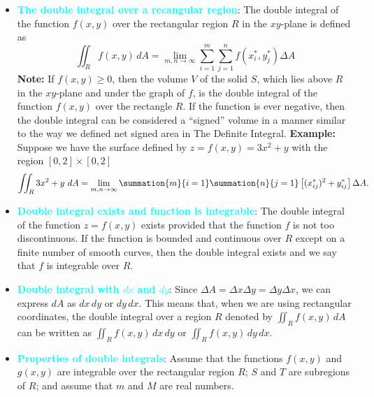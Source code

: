 \documentclass{report}
\begin{document}
\begin{itemize}
        \item \textbf{\textcolor{cyan}{The double integral over a recangular region}}:
            The double integral of the function $f(x,y)$ over the rectangular region $R$ in the $xy$-plane is defined as
            \begin{equation}
                \iint_{R} f(x,y) \, dA = \lim_{m,n \to \infty} \sum_{i=1}^{m}\sum_{j=1}^{n} f(x^*_{i}, y^*_{j})\Delta A 
            \end{equation}
            \bigbreak \noindent 
            \textbf{Note:} If $f(x,y) \geq 0$, then the volume $V$ of the solid $S$, which lies above $R$ in the $xy$-plane and under the graph of $f$, is the double integral of the function $f(x,y)$ over the rectangle $R$. If the function is ever negative, then the double integral can be considered a “signed” volume in a manner similar to the way we defined net signed area in The Definite Integral.
            \bigbreak \noindent 
            \textbf{Example:} Suppose we have the surface defined by $z=f(x,y) = 3x^{2} + y$ with the region $[0,2] \times [0,2]$
            \begin{align*}
                \iint_{R} 3x^{2} + y\ dA = \lim\limits_{m,n \to \infty}{\summation{m}{i=1}\summation{n}{j=1} \left[(x^{*}_{ij})^{2} + y^{*}_{ij}\right]\Delta A}
            .\end{align*}
        \item \textbf{\textcolor{cyan}{Double integral exists and function is integrable}}:
            The double integral of the function $z = f(x,y)$ exists provided that the function $f$ is not too discontinuous. If the function is bounded and continuous over $R$ except on a finite number of smooth curves, then the double integral exists and we say that $f$ is integrable over $R$.
        \item \textbf{\textcolor{cyan}{Double integral with $dx$ and $dy$}}: 
            Since $\Delta A = \Delta x \Delta y = \Delta y \Delta x$, we can express $dA$ as $dx\,dy$ or $dy\,dx$. This means that, when we are using rectangular coordinates, the double integral over a region $R$ denoted by $\iint_{R} f(x,y) \, dA$ can be written as $\iint_{R} f(x,y) \, dx\,dy$ or $\iint_{R} f(x,y) \, dy\,dx$.
        \item \textbf{\textcolor{cyan}{Properties of double integrals}}:
            Assume that the functions $f(x,y)$ and $g(x,y)$ are integrable over the rectangular region $R$; $S$ and $T$ are subregions of $R$; and assume that $m$ and $M$ are real numbers.
            \begin{enumerate}[label=\Roman*.]

\end{enumerate}
\end{itemize}
\end{document}
